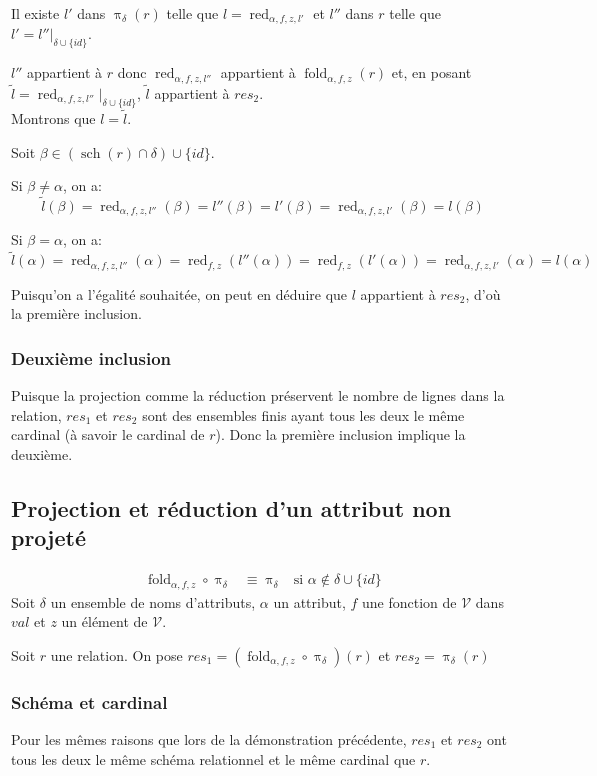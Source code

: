 \documentclass[french]{article}
\DeclareMathOperator{\proj}{\pi}
\DeclareMathOperator{\s}{sch}
\DeclareMathOperator{\redu}{red}
\newcommand{\projDelta}{\proj_{\delta}}
\newcommand{\val}{\mathcal{V}}
\newcommand{\cip}{\cup \{id\}}
\newcommand{\fold}[3]{\operatorname{fold}_{#1, #2, #3}}
\newcommand{\foldAlphafz}{\fold{\alpha}{f}{z}}
\newcommand{\dilta}{{\delta \cip}}
\begin{document}
Il existe $l'$ dans $\projDelta(r)$ telle que
$l = \redu_{\alpha, f, z, l'}$ et $l''$ dans $r$
telle que $l' = l''|_\dilta$.

$l''$ appartient à $r$ donc
$\redu_{\alpha, f, z, l''}$ appartient à $\foldAlphafz(r)$
et, en posant $\tilde{l} = \redu_{\alpha, f, z, l''}|_\dilta$,
$\tilde{l}$ appartient à $res_2$. \\

Montrons que $l = \tilde{l}$.

Soit $\beta \in (\s(r) \cap \delta) \cip$.

Si $ \beta \neq \alpha$, on a:
$$
\tilde{l}(\beta) =  \redu_{\alpha, f, z, l''}(\beta)
= l''(\beta) = l'(\beta) = \redu_{\alpha, f, z, l'}(\beta) = l(\beta)
$$

Si $\beta = \alpha$, on a:
$$
\tilde{l}(\alpha) = \redu_{\alpha, f, z, l''}(\alpha) = \redu_{f, z}(l''(\alpha))
= \redu_{f,z}(l'(\alpha)) = \redu_{\alpha, f, z, l'}(\alpha) = l(\alpha)
$$

Puisqu'on a l'égalité souhaitée, on peut en déduire que
$l$ appartient à $res_2$, d'où la première inclusion.

\subsubsection*{Deuxième inclusion}
Puisque la projection comme la réduction préservent le nombre de lignes
dans la relation,
 $res_1$ et $res_2$ sont des ensembles
finis ayant tous les deux le même cardinal
(à savoir le cardinal de $r$).
Donc la première inclusion implique la deuxième.

\subsection*{Projection et réduction d'un attribut non projeté}
\begin{align}
\foldAlphafz \circ \projDelta
& \equiv \projDelta
& \text{si $\alpha \notin \dilta$}
\end{align}
Soit $\delta$ un ensemble de noms d'attributs,
$\alpha$ un attribut, $f$ une fonction de $\val$
dans $val$ et $z$ un élément de $\val$.

Soit $r$ une relation. On pose $res_1 = (\foldAlphafz \circ \projDelta)(r) $ 
et $res_2 = \projDelta(r) $

\subsubsection*{Schéma et cardinal}
Pour les mêmes raisons que lors de la démonstration précédente,
$res_1$ et $res_2$ ont tous les deux le même schéma relationnel
et le même cardinal que $r$.
\end{document}
